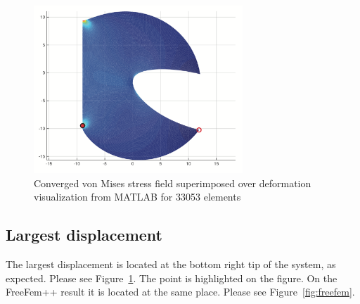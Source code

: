 \documentclass[11pt,fleqn]{article}
\begin{document}
\begin{figure}[!htb]
\centering
\includegraphics[width=0.7\textwidth]{matlab.png}
\caption{Converged von Mises stress field superimposed over deformation visualization from MATLAB for 33053 elements}
\label{fig:matlab}
\end{figure}

\subsection{Largest displacement}

The largest displacement is located at the bottom right tip of the system, as expected. Please see Figure~\ref{fig:matlab}. The point is highlighted on the figure. On the FreeFem++ result it is located at the same place. Please see Figure~\ref{fig:freefem}. 

\clearpage



\end{document}
